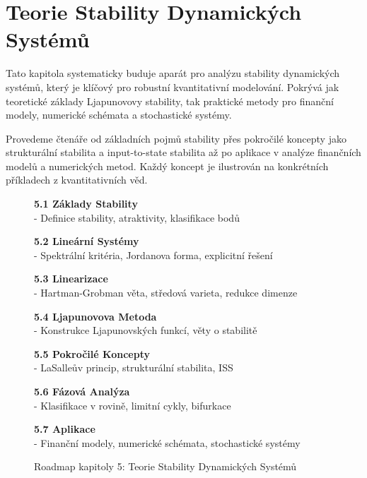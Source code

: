 \section{Teorie Stability Dynamických Systémů}
\label{sec:teorie-stability}

Tato kapitola systematicky buduje aparát pro analýzu stability dynamických systémů, který je klíčový pro robustní kvantitativní modelování. Pokrývá jak teoretické základy Ljapunovovy stability, tak praktické metody pro finanční modely, numerické schémata a stochastické systémy.

Provedeme čtenáře od základních pojmů stability přes pokročilé koncepty jako strukturální stabilita a input-to-state stabilita až po aplikace v analýze finančních modelů a numerických metod. Každý koncept je ilustrován na konkrétních příkladech z kvantitativních věd.

\begin{figure}[H]
\begin{tcolorbox}[title=Roadmap Kapitoly 5]
\item[] \textbf{5.1 Základy Stability} \\- Definice stability, atraktivity, klasifikace bodů
\item[] \textbf{5.2 Lineární Systémy} \\- Spektrální kritéria, Jordanova forma, explicitní řešení  
\item[] \textbf{5.3 Linearizace} \\- Hartman-Grobman věta, středová varieta, redukce dimenze
\item[] \textbf{5.4 Ljapunovova Metoda} \\- Konstrukce Ljapunovských funkcí, věty o stabilitě
\item[] \textbf{5.5 Pokročilé Koncepty} \\- LaSalleův princip, strukturální stabilita, ISS
\item[] \textbf{5.6 Fázová Analýza} \\- Klasifikace v rovině, limitní cykly, bifurkace
\item[] \textbf{5.7 Aplikace} \\- Finanční modely, numerické schémata, stochastické systémy
\end{tcolorbox}
\caption{Roadmap kapitoly 5: Teorie Stability Dynamických Systémů}
\label{fig:roadmap-chapter5}
\end{figure}

\spc

